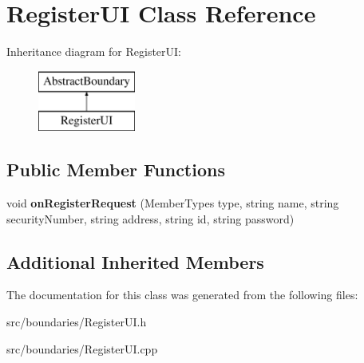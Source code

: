 \hypertarget{class_register_u_i}{}\section{Register\+UI Class Reference}
\label{class_register_u_i}
Inheritance diagram for Register\+UI\+:\begin{figure}[H]
\begin{center}
\leavevmode
\includegraphics[height=2.000000cm]{class_register_u_i}
\end{center}
\end{figure}
\subsection*{Public Member Functions}
\begin{DoxyCompactItemize}
\item 
\mbox{\label{class_register_u_i_aae14cecd8059e2542695140d1b25c30c}} 
void {\bfseries on\+Register\+Request} (Member\+Types type, string name, string security\+Number, string address, string id, string password)
\end{DoxyCompactItemize}
\subsection*{Additional Inherited Members}


The documentation for this class was generated from the following files\+:\begin{DoxyCompactItemize}
\item 
src/boundaries/Register\+U\+I.\+h\item 
src/boundaries/Register\+U\+I.\+cpp\end{DoxyCompactItemize}
